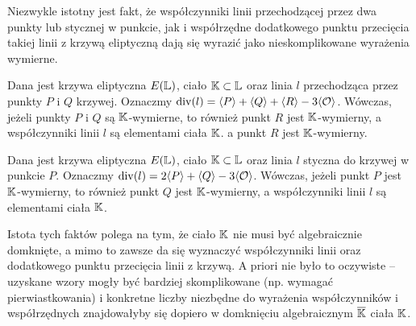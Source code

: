 Niezwykle istotny jest fakt,
że współczynniki linii przechodzącej przez dwa punkty
lub stycznej w punkcie,
jak i współrzędne dodatkowego punktu przecięcia
takiej linii z krzywą eliptyczną dają się wyrazić
jako nieskomplikowane wyrażenia wymierne.

\begin{fact}
Dana jest krzywa eliptyczna $E(\mathbb{L})$, ciało $\mathbb{K} \subset \mathbb{L}$
oraz linia $l$ przechodząca przez punkty $P$ i $Q$ krzywej.
Oznaczmy $\operatorname{div}(l) = \langle P\rangle + \langle Q\rangle + \langle R\rangle - 3\langle\mathcal{O}\rangle$.
Wówczas, jeżeli punkty $P$ i $Q$ są $\mathbb{K}$-wymierne,
to również punkt $R$ jest $\mathbb{K}$-wymierny,
a współczynniki linii $l$ są elementami ciała $\mathbb{K}$.
a punkt $R$ jest $\mathbb{K}$-wymierny.
\end{fact}

\begin{fact}
Dana jest krzywa eliptyczna $E(\mathbb{L})$, ciało $\mathbb{K} \subset \mathbb{L}$
oraz linia $l$ styczna do krzywej w punkcie $P$.
Oznaczmy $\operatorname{div}(l) = 2\langle P\rangle + \langle Q\rangle - 3\langle\mathcal{O}\rangle$.
Wówczas, jeżeli punkt $P$ jest $\mathbb{K}$-wymierny,
to również punkt $Q$ jest $\mathbb{K}$-wymierny,
a współczynniki linii $l$ są elementami ciała $\mathbb{K}$.
\end{fact}

Istota tych faktów polega na tym,
że ciało $\mathbb{K}$ nie musi być algebraicznie domknięte,
a mimo to zawsze da się wyznaczyć współczynniki linii
oraz dodatkowego punktu przecięcia linii z krzywą.
A priori nie było to oczywiste --
uzyskane wzory mogły być bardziej skomplikowane (np. wymagać pierwiastkowania)
i konkretne liczby niezbędne do wyrażenia współczynników i współrzędnych
znajdowałyby się dopiero w domknięciu algebraicznym $\overline{\mathbb{K}}$
ciała $\mathbb{K}$.
